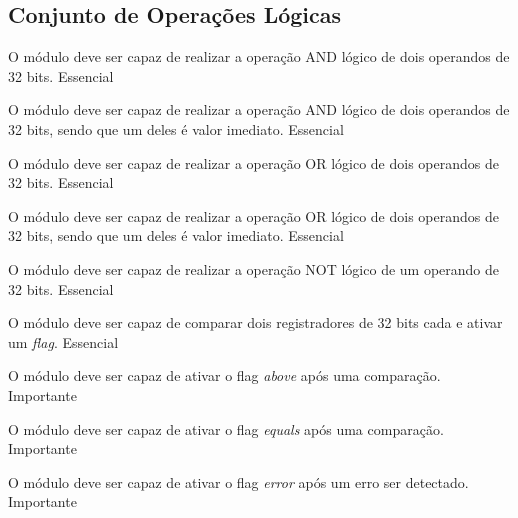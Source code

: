 \subsection{Conjunto de Operações Lógicas} 
  
    \begin{functional}
    
      {O módulo deve ser capaz de realizar a operação AND lógico de dois operandos de 32 bits.}
      {Essencial}
      
      {O módulo deve ser capaz de realizar a operação AND lógico de dois operandos de 32 bits, sendo que um deles é valor imediato.}
      {Essencial}

      {O módulo deve ser capaz de realizar a operação OR lógico de dois operandos de 32 bits.}
      {Essencial}  
      
      {O módulo deve ser capaz de realizar a operação OR lógico de dois operandos de 32 bits, sendo que um deles é valor imediato.}
      {Essencial} 
      
      {O módulo deve ser capaz de realizar a operação NOT lógico de um operando de 32 bits.}
      {Essencial}   
      
      {O módulo deve ser capaz de comparar dois registradores de 32 bits cada e ativar um \textit{flag}.}
      {Essencial}
      
      {O módulo deve ser capaz de ativar o flag \textit{above} após uma comparação.}
      {Importante}
      
      {O módulo deve ser capaz de ativar o flag \textit{equals} após uma comparação.}
      {Importante}
      
      {O módulo deve ser capaz de ativar o flag \textit{error} após um erro ser detectado.}
      {Importante}
      
    \end{functional}